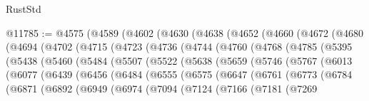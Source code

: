 \begin{lexlean}{RustStd}
\begin{coremodule}
{\begin{coremodule}
{{{{{{{{{{{{{{{{{{{{{{{{{{{{{{{{{{{{{{{{{{{{{{{{{{{{{{{{{{{{{{{{{{{{{{{{{{{{{{{{@11785 := @4575
    (@4589
      (@4602
        (@4630
          (@4638
            (@4652
              (@4660
                (@4672
                  (@4680
                    (@4694
                      (@4702
                        (@4715
                          (@4723
                            (@4736
                              (@4744
                                (@4760
                                  (@4768
                                    (@4785
                                      (@5395
                                        (@5438
                                          (@5460
                                            (@5484
                                              (@5507
                                                (@5522
                                                  (@5638
                                                    (@5659
                                                      (@5746
                                                        (@5767
                                                          (@6013
                                                            (@6077
                                                              (@6439
                                                                (@6456
                                                                  (@6484
                                                                    (@6555
                                                                      (@6575
                                                                        (@6647
                                                                          (@6761
                                                                            (@6773
                                                                              (@6784
                                                                                (@6871
                                                                                  (@6892
                                                                                    (@6949
                                                                                      (@6974
                                                                                        (@7094
                                                                                          (@7124
                                                                                            (@7166
                                                                                              (@7181
                                                                                                (@7269
}}}}}}}}}}}}}}}}}}}}}}}}}}}}}}}}}}}}}}}}}}}}}}}}}}}}}}}}}}}}}}}}}}}}}}}}}}}}}}}}
\end{coremodule}}
\end{coremodule}
\end{lexlean}
